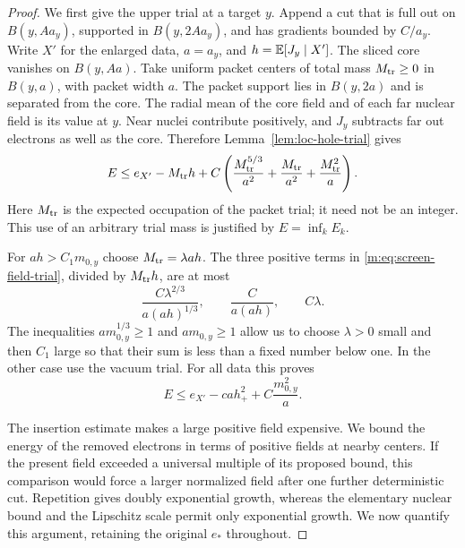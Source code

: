 \begin{proof}
We first give the upper trial at a target $y$.  Append a cut that is
full out on $B(y,Aa_y)$, supported in $B(y,2Aa_y)$, and has gradients
bounded by $C/a_y$.  Write $X'$ for the enlarged data, $a=a_y$, and
$h=\mathbb E[J_y\mid X']$.  The sliced core vanishes on $B(y,Aa)$.
Take uniform packet centers of total mass $M_{\rm tr}\ge0$ in $B(y,a)$, with
packet width $a$.  The packet support lies in $B(y,2a)$ and is separated
from the core.  The radial mean of the core field and of each far nuclear
field is its value at $y$.  Near nuclei contribute positively, and
$J_y$ subtracts far out electrons as well as the core.  Therefore
Lemma~\ref{lem:loc-hole-trial} gives
\begin{equation}\label{m:eq:screen-field-trial}
 E\le e_{X'}-M_{\rm tr}h+C\left(\frac{M_{\rm tr}^{5/3}}{a^2}
                     +\frac{M_{\rm tr}}{a^2}+\frac{M_{\rm tr}^2}{a}\right).
\end{equation}
Here $M_{\rm tr}$ is the expected occupation of the packet trial; it need not be
an integer.  This use of an arbitrary trial mass is justified by
$E=\inf_k E_k$.

For $ah>C_1m_{0,y}$ choose $M_{\rm tr}=\lambda ah$.  The three positive terms in
\eqref{m:eq:screen-field-trial}, divided by $M_{\rm tr}h$, are at most
\[
 \frac{C\lambda^{2/3}}{a(ah)^{1/3}},\qquad
 \frac{C}{a(ah)},\qquad C\lambda.
\]
The inequalities $am_{0,y}^{1/3}\ge1$ and $am_{0,y}\ge1$ allow us to
choose $\lambda>0$ small and then $C_1$ large so that their sum is less
than a fixed number below one.  In the other case use the vacuum trial.
For all data this proves
\begin{equation}\label{m:eq:screen-field-upper}
 E\le e_{X'}-ca h_+^2+C\frac{m_{0,y}^2}{a}.
\end{equation}

The insertion estimate makes a large positive field expensive.  We
bound the energy of the removed electrons in terms of positive fields
at nearby centers.  If the present field exceeded a universal multiple
of its proposed bound, this comparison would force a larger normalized
field after one further deterministic cut.  Repetition gives doubly
exponential growth, whereas the elementary nuclear bound and the
Lipschitz scale permit only exponential growth.  We now quantify this
argument, retaining the original $e_*$ throughout.


\end{proof}
